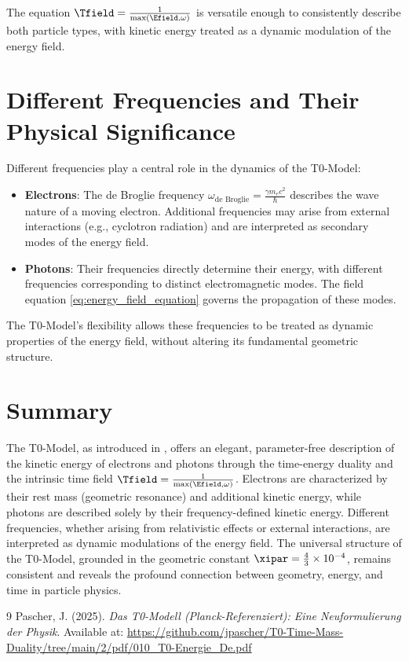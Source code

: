 The equation \( \Tfield = \frac{1}{\max(\Efield, \omega)} \) is versatile enough to consistently describe both particle types, with kinetic energy treated as a dynamic modulation of the energy field.

\section{Different Frequencies and Their Physical Significance}
\label{sec:frequencies}

Different frequencies play a central role in the dynamics of the T0-Model:

\begin{itemize}
	\item \textbf{Electrons}: The de Broglie frequency \(\omega_{\text{de Broglie}} = \frac{\gamma m_e c^2}{\hbar}\) describes the wave nature of a moving electron. Additional frequencies may arise from external interactions (e.g., cyclotron radiation) and are interpreted as secondary modes of the energy field.
	\item \textbf{Photons}: Their frequencies directly determine their energy, with different frequencies corresponding to distinct electromagnetic modes. The field equation \eqref{eq:energy_field_equation} governs the propagation of these modes.
\end{itemize}

The T0-Model's flexibility allows these frequencies to be treated as dynamic properties of the energy field, without altering its fundamental geometric structure.

\section{Summary}
\label{sec:summary}

The T0-Model, as introduced in \cite{pascher_t0_energy_2025}, offers an elegant, parameter-free description of the kinetic energy of electrons and photons through the time-energy duality and the intrinsic time field \( \Tfield = \frac{1}{\max(\Efield, \omega)} \). Electrons are characterized by their rest mass (geometric resonance) and additional kinetic energy, while photons are described solely by their frequency-defined kinetic energy. Different frequencies, whether arising from relativistic effects or external interactions, are interpreted as dynamic modulations of the energy field. The universal structure of the T0-Model, grounded in the geometric constant \(\xipar = \frac{4}{3} \times 10^{-4}\), remains consistent and reveals the profound connection between geometry, energy, and time in particle physics.

\begin{thebibliography}{9}
	Pascher, J. (2025). \textit{Das T0-Modell (Planck-Referenziert): Eine Neuformulierung der Physik}. 
	Available at: \url{https://github.com/jpascher/T0-Time-Mass-Duality/tree/main/2/pdf/010_T0-Energie_De.pdf}
\end{thebibliography}
